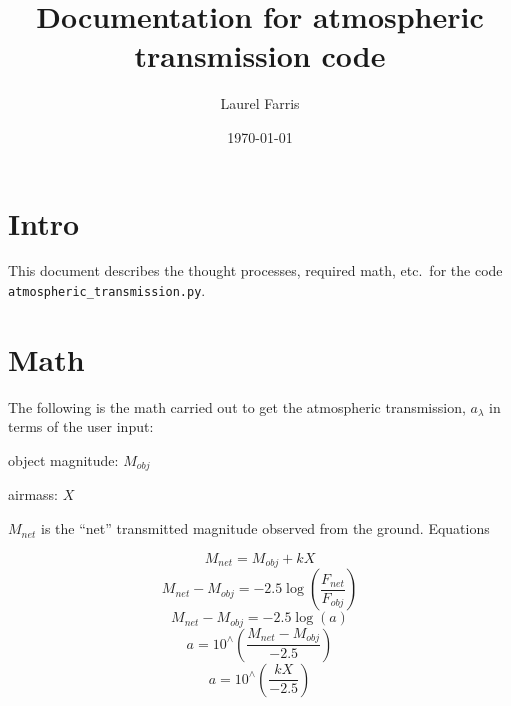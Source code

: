 \documentclass[12]{article}
\title{Documentation for atmospheric transmission code}
\author{Laurel Farris}
\date{\today}
\begin{document}
\vspace{-2in}
\maketitle

\section*{Intro}
This document describes the thought processes, required math, etc.\
for the code \verb|atmospheric_transmission.py|.

\section*{Math}

The following is the math carried out to get the atmospheric transmission,
$a_{\lambda}$ in terms of the user input:
\begin{itemize*}
    \item object magnitude: $M_{obj}$
    \item airmass: $X$
\end{itemize*}
$M_{net}$ is the ``net'' transmitted magnitude observed from the ground.
Equations

$$ M_{net} = M_{obj} + kX $$
$$ M_{net} - M_{obj} = -2.5\log\left(\frac{F_{net}}{F_{obj}}\right) $$
$$ M_{net} - M_{obj} = -2.5\log\left(a\right) $$
$$ a = 10^{\wedge}\left(\frac{M_{net}-M_{obj}}{-2.5}\right) $$
$$ a = 10^{\wedge}\left(\frac{kX}{-2.5}\right) $$
\end{document}
